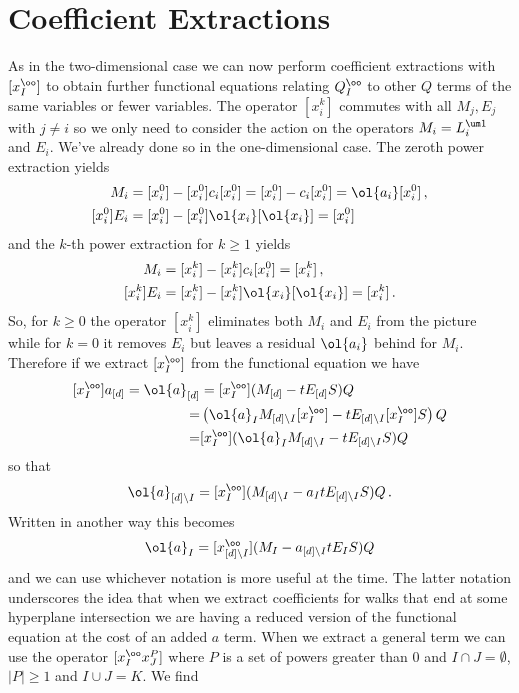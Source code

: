 \section{Coefficient Extractions}
As in the two-dimensional case we can now perform coefficient extractions with $[x_I^\oo]$ to obtain further functional equations relating $Q_I^\oo$ to other $Q$ terms of the same variables or fewer variables. The operator $[x_i^k]$ commutes with all $M_j, E_j$ with $j\neq i$ so we only need to consider the action on the operators $M_i = L_i^{\um 1}$ and $E_i$. We've already done so in the one-dimensional case. The zeroth power extraction yields
\begin{align}
	[x_i^0]M_i &= [x_i^0]-[x_i^0]c_i[x_i^0] = [x_i^0]-c_i[x_i^0] = \ol{a_i}[x_i^0]\,,\\
	[x_i^0]E_i &= [x_i^0] - [x_i^0]\ol{x_i}[\ol{x_i}] = [x_i^0]
\end{align}
and the $k$-th power extraction for $k\ge 1$ yields
\begin{align}
	[x_i^k]M_i &= [x_i^k]-[x_i^k]c_i[x_i^0] = [x_i^k]\,,\\
	[x_i^k]E_i &= [x_i^k] - [x_i^k]\ol{x_i}[\ol{x_i}] = [x_i^k]\,.
\end{align}
So, for $k\ge 0$ the operator $[x_i^k]$ eliminates both $M_i$ and $E_i$ from the picture while for $k = 0$ it removes $E_i$ but leaves a residual $\ol{a_i}$ behind for $M_i$. Therefore if we extract $[x_I^\oo]$ from the functional equation we have
\begin{align}\begin{split}
	[x_I^\oo]a_{[d]} =\ol{a}_{[d]} &= [x_I^\oo](M_{[d]} - tE_{[d]}S)Q \\
	= &\left(\ol{a}_{I}M_{[d]\backslash I}[x_I^\oo] - tE_{[d]\backslash I}[x_I^\oo]S\right)Q\\
	= &[x_I^\oo](\ol{a}_{I}M_{[d]\backslash I}- tE_{[d]\backslash I}S)Q
\end{split}\end{align}
so that
\begin{align}
	\ol{a}_{[d]\backslash I} = [x_I^\oo](M_{[d]\backslash I}- a_{I}tE_{[d]\backslash I}S)Q\,.
\end{align}
Written in another way this becomes
\begin{align}
	\ol{a}_I = [x_{[d]\backslash I}^\oo](M_I - a_{[d]\backslash I} tE_I S)Q
\end{align}
and we can use whichever notation is more useful at the time. The latter notation underscores the idea that when we extract coefficients for walks that end at some hyperplane intersection we are having a reduced version of the functional equation at the cost of an added $a$ term. When we extract a general term we can use the operator $[x_I^\oo x_J^P]$ where $P$ is a set of powers greater than 0 and $I\cap J = \emptyset$, $|P| \ge 1$ and $I\cup J = K$. We find
